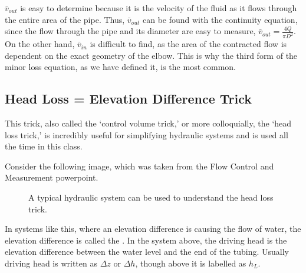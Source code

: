 \documentclass[letterpaper,10pt,english]{sphinxmanual}
\let\sphinxpxdimen\pdfpxdimen\else\newdimen\sphinxpxdimen
\begin{document}
\(\bar v_{out}\) is easy to determine because it is the velocity of the fluid as it flows through the entire area of the pipe. Thus, \(\bar v_{out}\) can be found with the continuity equation, since the flow through the pipe and its diameter are easy to measure, \(\bar v_{out} = \frac{4 Q}{\pi D^2}\). On the other hand, \(\bar v_{in}\) is difficult to find, as the area of the contracted flow is dependent on the exact geometry of the elbow. This is why the third form of the minor loss equation, as we have defined it, is the most common.


\subsection{Head Loss = Elevation Difference Trick}
\label{\detokenize{Fluids_Review/Fluids_Review_Design:head-loss-elevation-difference-trick}}\label{\detokenize{Fluids_Review/Fluids_Review_Design:id9}}
This trick, also called the ‘control volume trick,’ or more colloquially, the ‘head loss trick,’ is incredibly useful for simplifying hydraulic systems and is used all the time in this class.

Consider the following image, which was taken from the Flow Control and Measurement powerpoint.

\begin{figure}[htbp]
\centering
\capstart

\noindent\sphinxincludegraphics[width=650\sphinxpxdimen]{{head_loss_trick}.png}
\caption{A typical hydraulic system can be used to understand the head loss trick.}\label{\detokenize{Fluids_Review/Fluids_Review_Design:id20}}\label{\detokenize{Fluids_Review/Fluids_Review_Design:head-loss-trick}}\end{figure}

In systems like this, where an elevation difference is causing the flow of water, the elevation difference is called the . In the system above, the driving head is the elevation difference between the water level and the end of the tubing. Usually driving head is written as \(\Delta z\) or \(\Delta h\), though above it is labelled as \(h_L\).
\end{document}
